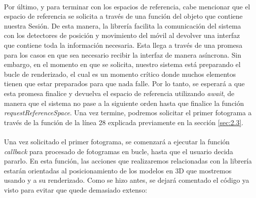 \documentclass{subfiles}
\begin{document}
        \paragraph{}
        Por último, y para terminar con los espacios de referencia, cabe mencionar que el espacio de referencia se solicita a través de una función del objeto que contiene nuestra Sesión. De esta manera, la librería facilita la comunicación del sistema con los detectores de posición y movimiento del móvil al devolver una interfaz que contiene toda la información necesaria. Esta llega a través de una promesa para los casos en que sea necesario recibir la interfaz de manera asíncrona. Sin embargo, en el momento en que se solicita, nuestro sistema está preparando el bucle de renderizado, el cual es un momento crítico donde muchos elementos tienen que estar preparados para que nada falle. Por lo tanto, se esperará a que esta promesa finalice y devuelva el espacio de referencia utilizando \textit{await}, de manera que el sistema no pase a la siguiente orden hasta que finalice la función \textit{requestReferenceSpace}. Una vez termine, podremos solicitar el primer fotograma a través de la función de la línea 28 explicada previamente en la sección \ref{sec:2.3}.

        \paragraph{}
        Una vez solicitado el primer fotograma, se comenzará a ejecutar la función \textit{callback} para procesado de fotogramas en bucle, hasta que el usuario decida pararlo. En esta función, las acciones que realizaremos relacionadas con la librería \threejs estarán orientadas al posicionamiento de los modelos en 3D que mostremos usando \ra y a su renderizado. Como se hizo antes, se dejará comentado el código ya visto para evitar que quede demasiado extenso:
\end{document}
